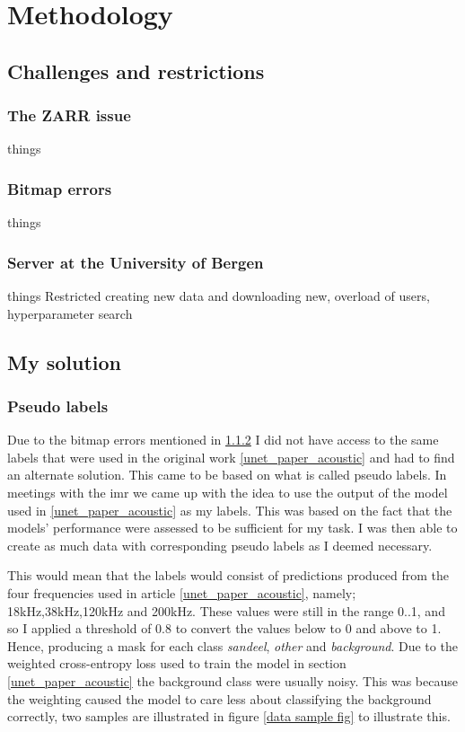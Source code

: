 \chapter{Methodology}
\section{Challenges and restrictions}
    \subsection{The ZARR issue}
        things
    \subsection{Bitmap errors} \label{bitmap_error}
        things
        
    \subsection{Server at the University of Bergen}
        things
        Restricted creating new data and downloading new, overload of users, hyperparameter search
        
    

\section{My solution}
    \subsection{Pseudo labels} \label{Pseudo label}
        Due to the bitmap errors mentioned in \ref{bitmap_error} I did not have access to the same labels that were used in the original work \ref{unet_paper_acoustic} and had to find an alternate solution. This came to be based on what is called pseudo labels. In meetings with the \gls{imr} we came up with the idea to use the output of the model used in \ref{unet_paper_acoustic} as my labels. This was based on the fact that the models' performance were assessed to be sufficient for my task. I was then able to create as much data with corresponding pseudo labels as I deemed necessary.
        
        This would mean that the labels would consist of predictions produced from the four frequencies used in article \ref{unet_paper_acoustic}, namely; 18kHz,38kHz,120kHz and 200kHz. These values were still in the range 0..1, and so I applied a threshold of 0.8 to convert the values below to 0 and above to 1. Hence, producing a mask for each class \textit{sandeel}, \textit{other} and \textit{background}. Due to the weighted cross-entropy loss used to train the model in section \ref{unet_paper_acoustic} the background class were usually noisy. This was because the weighting caused the model to care less about classifying the background correctly, two samples are illustrated in figure \ref{data sample fig} to illustrate this.
        
